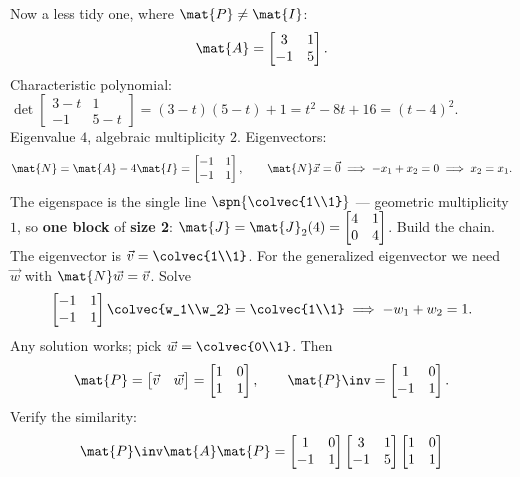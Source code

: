 \begin{example}
\label{ch28:ex-notjordan}
Now a less tidy one, where $\mat{P}\neq\mat{I}$:
\[
\mat{A}=\begin{bmatrix}3&1\\-1&5\end{bmatrix}.
\]
Characteristic polynomial: $\det\!\begin{bmatrix}3-t&1\\-1&5-t\end{bmatrix}
=(3-t)(5-t)+1=t^2-8t+16=(t-4)^2$. Eigenvalue $4$, algebraic multiplicity $2$. Eigenvectors:
\[
\mat{N}=\mat{A}-4\mat{I}=\begin{bmatrix}-1&1\\-1&1\end{bmatrix},\qquad
\mat{N}\vec{x}=\vec{0}\;\Longrightarrow\; -x_1+x_2=0\;\Longrightarrow\; x_2=x_1.
\]
The eigenspace is the single line $\spn\{\colvec{1\\1}\}$ --- geometric multiplicity $1$,
so \textbf{one block} of \textbf{size 2}: $\mat{J}=\mat{J}_2(4)=\begin{bmatrix}4&1\\0&4\end{bmatrix}$.
Build the chain. The eigenvector is $\vec{v}=\colvec{1\\1}$. For the generalized
eigenvector we need $\vec{w}$ with $\mat{N}\vec{w}=\vec{v}$. Solve
\[
\begin{bmatrix}-1&1\\-1&1\end{bmatrix}\colvec{w_1\\w_2}=\colvec{1\\1}
\;\Longrightarrow\; -w_1+w_2=1.
\]
Any solution works; pick $\vec{w}=\colvec{0\\1}$. Then
\[
\mat{P}=\begin{bmatrix}\vec{v}&\vec{w}\end{bmatrix}=\begin{bmatrix}1&0\\1&1\end{bmatrix},
\qquad \mat{P}\inv=\begin{bmatrix}1&0\\-1&1\end{bmatrix}.
\]
Verify the similarity:
\[
\mat{P}\inv\mat{A}\mat{P}
=\begin{bmatrix}1&0\\-1&1\end{bmatrix}\begin{bmatrix}3&1\\-1&5\end{bmatrix}\begin{bmatrix}1&0\\1&1\end{bmatrix}
\]
\end{example}
